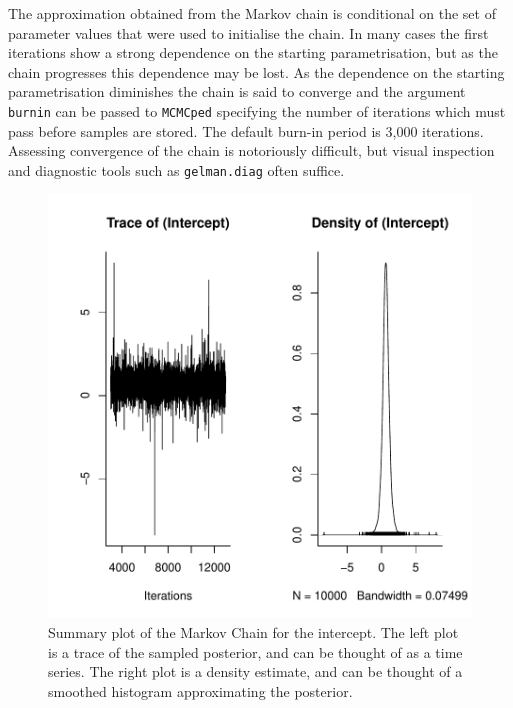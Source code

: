 \documentclass{article}
\begin{document}
The approximation obtained from the Markov chain is conditional on the set of parameter values that were used to initialise the chain.  In many cases the first iterations show a strong dependence on the starting parametrisation, but as the chain progresses this dependence may be lost.  As the dependence on the starting parametrisation diminishes the chain is said to converge and the argument \texttt{burnin} can be passed to \texttt{MCMCped} specifying the number of iterations which must pass before samples are stored. The default burn-in period is 3,000 iterations. Assessing convergence of the chain is notoriously difficult, but visual inspection and diagnostic tools such as \texttt{gelman.diag} often suffice.

\begin{Schunk}
\end{Schunk}

\begin{figure}[!h]
\begin{center}
\includegraphics{Lecture1-058}
\end{center}
\caption{Summary plot of the Markov Chain for the intercept.  The left plot is a trace of the sampled posterior, and can be thought of as a time series.  The right plot is a density estimate, and can be thought of a smoothed histogram approximating the posterior.}
\label{time.series-fig}
\end{figure}
\end{document}
